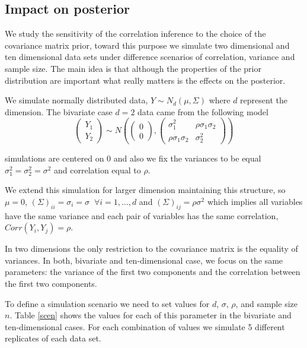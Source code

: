 \documentclass{article}
\begin{document}
\subsection{Impact on posterior} 

We study the sensitivity of the correlation inference to the choice of the covariance matrix prior, toward this purpose we simulate two dimensional and ten dimensional data sets under difference scenarios of correlation, variance and sample size. The main idea is that although the properties of the prior distribution are important what really matters is the effects on the posterior.

We simulate normally distributed data, $Y \sim N_d(\mu, \Sigma) $ where $d$ represent the dimension. The bivariate case $d=2$ data came from the following model 
\begin{equation}
\begin{pmatrix}  Y_1 \\ Y_2 \end{pmatrix} \sim 
N\left( \begin{pmatrix}  0 \\ 0 \end{pmatrix}, \begin{pmatrix}  \sigma_{1}^2 & \rho\sigma_{1}\sigma_{2} \\ \rho\sigma_{1}\sigma_{2} & \sigma_{2}^2 \end{pmatrix} \right)
\label{modsim}
\end{equation} 

simulations are centered on 0 and also we fix the variances to be equal $\sigma_{1}^2=\sigma_{2}^2=\sigma^2$ and correlation equal to $\rho$. 

We extend this simulation for larger dimension maintaining this structure, so $\mu= 0$, $(\Sigma)_{ii} = \sigma_{i}=\sigma \;\; \forall i=1,\ldots,d$ and $(\Sigma)_{ij} = \rho\sigma^2$ which implies all variables have the same variance and each pair of variables has the same correlation, $Corr(Y_{i}, Y_{j}) = \rho$. 

In two dimensions the only restriction to the covariance matrix is the equality of variances. In both, bivariate and ten-dimensional case, we focus on the same parameters: the variance of the first two components and the correlation between the first two components. 

To define a simulation scenario we need to set values for $d$, $\sigma$, $\rho$, and sample size $n$. Table \ref{scen} shows the values for each of this parameter in the bivariate and ten-dimensional cases. For each combination of values we simulate 5 different replicates of each data set.  
\end{document}
